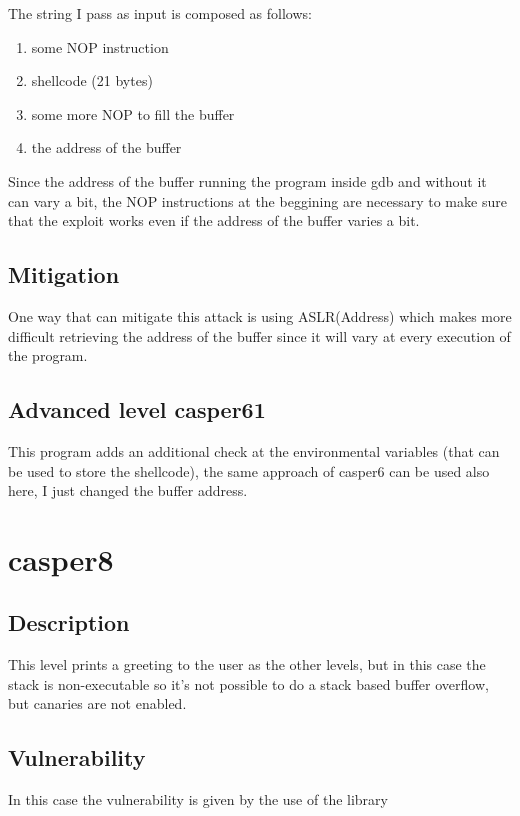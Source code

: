 \documentclass[a4paper,12pt]{article}
\begin{document}
The string I pass as input is composed as follows:
\begin{enumerate}
\item some NOP instruction
\item shellcode (21 bytes)
\item some more NOP to fill the buffer
\item the address of the buffer
\end{enumerate}

Since the address of the buffer running the program inside gdb and without it can vary a bit, the NOP instructions at the beggining are necessary to make sure that the exploit works even if the address of the buffer varies a bit.


\subsection{Mitigation}

One way that can mitigate this attack is using ASLR(Address)
which makes more difficult retrieving the address of the buffer since it will vary at every execution of the program.


\subsection{Advanced level casper61}

This program adds an additional check at the environmental variables (that can be used to store the shellcode), the same approach of casper6 can be used also here, I just changed the buffer address.

\section{casper8}
\subsection{Description}

This level prints a greeting to the user as the other levels, but in this case the stack is non-executable so it's not possible to do a stack based buffer overflow, but canaries are not enabled.

\subsection{Vulnerability}

In this case the vulnerability is given by the use of the library 
\end{document}
